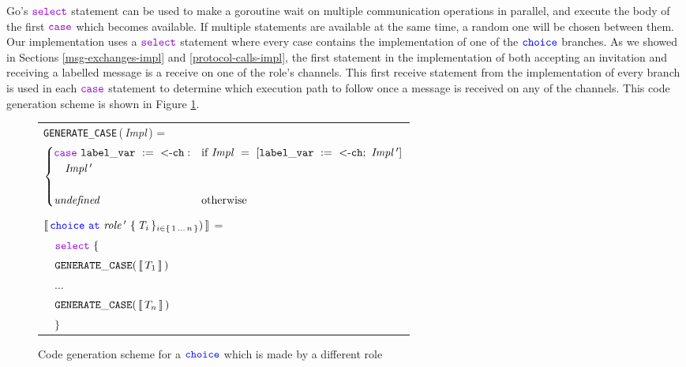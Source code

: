 \documentclass[12pt,twoside]{report}
\begin{document}
Go's $\goselect$ statement can be used to make a goroutine wait on multiple communication operations in parallel\cite{tourofgo}, and execute the body of the first $\gocase$ which becomes available. If multiple statements are available at the same time, a random one will be chosen between them. Our implementation uses a $\goselect$ statement where every case contains the implementation of one of the ${\color{blue}\mathtt{choice}}$ branches. As we showed in Sections \ref{msg-exchanges-impl} and \ref{protocol-calls-impl}, the first statement in the implementation of both accepting an invitation and receiving a labelled message is a receive on one of the role's channels. This first receive statement from the implementation of every branch is used in each $\gocase$ statement to determine which execution path to follow once a message is received on any of the channels. This code generation scheme is shown in Figure \ref{role-receives-choice-codegen}.

\begin{figure}[!h]
    \begin{center}
        \begin{tabular}{l}
            \texttt{GENERATE\_CASE}\,(\,\textit{Impl}\,) = \\[3pt]
            \begin{math}
                \begin{cases}
                    \gocase\ \assignment{label\_var}{\text{<-}\varname{ch}}: & \text{if}\ \mathit{Impl}\ =\ [\assignment{label\_var}{\text{<-}\varname{ch}};\ \mathit{Impl\,'}]\\
                    \quad \mathit{Impl\,'} & \\\\
                    \mathit{undefined} & \text{otherwise}
                \end{cases}
            \end{math}\\\\[6pt]

            $\llbracket\,{\color{blue}\mathtt{choice}}\ {\color{blue}\mathtt{at}}\ \mathit{role\,'}\ \{\,\mathit{T}_{i}\,\}_{{i \in \{\,1\,\dots\,n\,\}}})\,\rrbracket$ =\\[10pt]
            
            $\quad \goselect\ \{$\\[3pt]

            $\quad \mathtt{GENERATE\_CASE}(\, \llbracket\,T_1\,\rrbracket\,)$\\[6pt]

            $\quad \dots$\\[9pt]
            
            $\quad \mathtt{GENERATE\_CASE}(\, \llbracket\,T_n\,\rrbracket\,)$\\[6pt]
            $\quad \}$\\
        \end{tabular}
    \end{center}
    \caption{Code generation scheme for a ${\color{blue}\mathtt{choice}}$ which is made by a different role}
    \label{role-receives-choice-codegen}
\end{figure}
\end{document}
